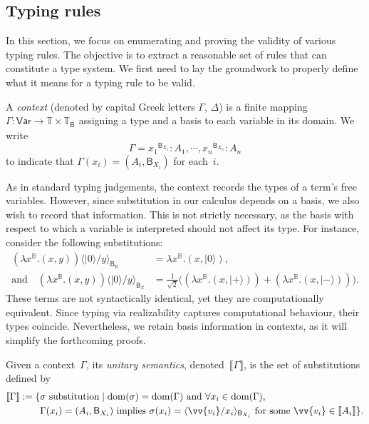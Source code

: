 \documentclass[runningheads,orivec,envcountsame,envcountsect]{llncs}
\newcommand\ket[1]{\ensuremath{|#1\rangle}}
\newcommand\Var{\ensuremath{\mathsf{Var}}}
\newcommand\ansubst[2]{\ensuremath{\langle #1 \rangle_{#2}}}
\newcommand\dom[1]{\mathrm{dom}(#1)}
\def\Pair#1#2{(#1,#2)} %
\def\Lam#1#2#3{\lambda#1^{#2}{.}#3} %
\def\Type{\mathbb{T}}
\def\BasisType{\Type_{\basis{}}}
\def\sem#1{\llbracket#1\rrbracket}
\newcommand\B{\mathbb B}
\newcommand\XB{\mathbb X}
\newcommand\basis[1]{\ensuremath{\mathsf{B}_{#1}}}
\begin{document}
\subsection{Typing rules}    
In this section, we focus on enumerating and proving the validity of various
typing rules. The objective is to extract a reasonable set of rules that can
constitute a type system. We first need to lay the groundwork to properly define
what it means for a typing rule to be valid.

\begin{definition}
  A \emph{context} (denoted by capital Greek letters $\Gamma$, $\Delta$) is a
  finite mapping $\Gamma:\Var\to\Type\times\BasisType$ assigning a type and a
  basis to each variable in its domain. We write
  \[
    \Gamma = {x_1}^{\basis{X_1}}:A_1,\dotsb, {x_n}^{\basis{X_n}}:A_n
  \]
  to indicate that $\Gamma(x_i)=(A_i,\basis{X_i})$ for each~$i$.
\end{definition}

As in standard typing judgements, the context records the types of a term's
free variables. However, since substitution in our calculus depends on a basis,
we also wish to record that information. This is not strictly necessary, as the
basis with respect to which a variable is interpreted should not affect its
type. For instance, consider the following substitutions:
\begin{align*}
(\Lam{x}{\B}{\Pair{x}{y}})\ansubst{\ket{0}/y}{\basis{\B}}
  &= \Lam{x}{\B}{\Pair{x}{\ket{0}}},\\
\text{and}\quad
(\Lam{x}{\B}{(x, y)})\ansubst{\ket{0}/y}{\basis{\XB}}
  &= \tfrac{1}{\sqrt{2}}
    \bigl((\Lam{x}{\B}{\Pair{x}{\ket{+}}})
         + (\Lam{x}{\B}{\Pair{x}{\ket{-}}})\bigr).
\end{align*}
These terms are not syntactically identical, yet they are computationally
equivalent. 
Since typing via realizability captures computational behaviour,
their types coincide. Nevertheless, we retain basis information in contexts, as
it will simplify the forthcoming proofs.

\begin{definition}
  Given a context~$\Gamma$, its \emph{unitary semantics},
  denoted~$\sem{\Gamma}$, is the set of substitutions defined by
  \begin{align*}
    \sem{\Gamma}
    := 
    \{&\sigma~\text{substitution} \mid 
      \dom{\sigma} = \dom{\Gamma}
      \text{ and } \forall {x_i} \in \dom{\Gamma},\\
      &\Gamma(x_i) = (A_i, \basis{X_i})
      \text{ implies }
      \sigma(x_i) = \ansubst{\vv{v_i}/x_i}{\basis{X_i}}
      \text{ for some }\vv{v_i} \in \sem{A_i}\}.
  \end{align*}
\end{definition}
\end{document}
